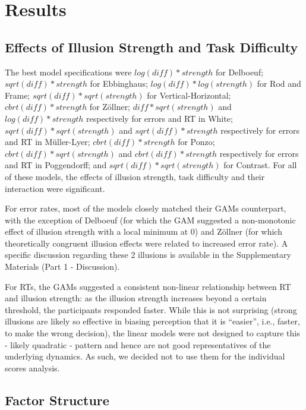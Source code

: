 \documentclass[
  man,floatsintext]{apa6}
\begin{document}
\hypertarget{results}{%
\section{Results}\label{results}}

\hypertarget{effects-of-illusion-strength-and-task-difficulty}{%
\subsection{Effects of Illusion Strength and Task Difficulty}\label{effects-of-illusion-strength-and-task-difficulty}}

The best model specifications were \(log(diff)*strength\) for Delboeuf; \(sqrt(diff)*strength\) for Ebbinghaus; \(log(diff)*log(strength)\) for Rod and Frame; \(sqrt(diff)*sqrt(strength)\) for Vertical-Horizontal; \(cbrt(diff)*strength\) for Zöllner; \(diff*sqrt(strength)\) and \(log(diff)*strength\) respectively for errors and RT in White; \(sqrt(diff)*sqrt(strength)\) and \(sqrt(diff)*strength\) respectively for errors and RT in Müller-Lyer; \(cbrt(diff)*strength\) for Ponzo; \(cbrt(diff)*sqrt(strength)\) and \(cbrt(diff)*strength\) respectively for errors and RT in Poggendorff; and \(sqrt(diff)*sqrt(strength)\) for Contrast. For all of these models, the effects of illusion strength, task difficulty and their interaction were significant.

For error rates, most of the models closely matched their GAMs counterpart, with the exception of Delboeuf (for which the GAM suggested a non-monotonic effect of illusion strength with a local minimum at 0) and Zöllner (for which theoretically congruent illusion effects were related to increased error rate). A specific discussion regarding these 2 illusions is available in the Supplementary Materials (Part 1 - Discussion).

For RTs, the GAMs suggested a consistent non-linear relationship between RT and illusion strength: as the illusion strength increases beyond a certain threshold, the participants responded faster. While this is not surprising (strong illusions are likely so effective in biasing perception that it is ``easier'', i.e., faster, to make the wrong decision), the linear models were not designed to capture this - likely quadratic - pattern and hence are not good representatives of the underlying dynamics. As such, we decided not to use them for the individual scores analysis.

\hypertarget{factor-structure}{%
\subsection{Factor Structure}\label{factor-structure}}
\end{document}
